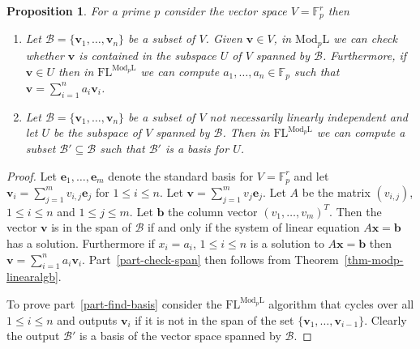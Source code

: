\documentclass[11pt]{madras}%
\newtheorem{proposition}[theorem]{Proposition}
\theoremstyle{remark}
\newcommand{\ModkL}[1]{{\ensuremath{\mathrm{Mod}_{#1}\mathrm{L}}}}
\begin{document}
\begin{proposition}\label{prop-compute-basis-fp}
  For a prime $p$ consider the vector space $V = \mathbb{F}_p^r$ then
  \begin{enumerate}
  \item \label{part-check-span}%
    Let $\mathcal{B} = \{ \mathbf{v}_1,\ldots,\mathbf{v}_n \}$ be a
    subset of $V$. Given $\mathbf{v} \in V$, in $\ModkL{p}$ we can
    check whether $\mathbf{v}$ is contained in the subspace $U$ of $V$
    spanned by $\mathcal{B}$. Furthermore, if $\mathbf{v} \in U$ then
    in $\mathrm{FL}^{\ModkL{p}}$ we can compute $a_1,\ldots,a_n \in
    \mathbb{F}_p$ such that $\mathbf{v} = \sum_{i=1}^n a_i
    \mathbf{v}_i$.
  \item \label{part-find-basis}%
    Let $\mathcal{B} = \{ \mathbf{v}_1,\ldots,\mathbf{v}_n \}$ be a
    subset of $V$ not necessarily linearly independent and let $U$ be
    the subspace of $V$ spanned by $\mathcal{B}$. Then in
    $\mathrm{FL}^{\ModkL{p}}$ we can compute a subset $\mathcal{B}'
    \subseteq \mathcal{B}$ such that $\mathcal{B}'$ is a basis for
    $U$.
  \end{enumerate}
\end{proposition}
\begin{proof}

  Let $\mathbf{e}_1,\ldots,\mathbf{e}_m$ denote the standard basis for
  $V = \mathbb{F}_p^r$ and let $\mathbf{v}_i = \sum_{j= 1}^m v_{i,j}
  \mathbf{e}_j$ for $1 \leq i \leq n$. Let $\mathbf{v} = \sum_{j =
    1}^m v_j \mathbf{e}_j$. Let $A$ be the matrix $(v_{i,j})$, $1\leq
  i \leq n$ and $1 \leq j \leq m$. Let $\mathbf{b}$ the column vector
  $(v_1,\ldots,v_m)^T$. Then the vector $\mathbf{v}$ is in the span of
  $\mathcal{B}$ if and only if the system of linear equation $A
  \mathbf{x} = \mathbf{b}$ has a solution. Furthermore if $x_i = a_i$,
  $1 \leq i \leq n$ is a solution to $A \mathbf{x} = \mathbf{b}$ then
  $\mathbf{v} = \sum_{i = 1}^n a_i \mathbf{v}_i$.
  Part~\ref{part-check-span} then follows from
  Theorem~\ref{thm-modp-linearalgb}.

  To prove part~\ref{part-find-basis} consider the
  $\mathrm{FL}^{\ModkL{p}}$ algorithm that cycles over all $1 \leq i
  \leq n$ and outputs $\mathbf{v}_i$ if it is not in the span of the
  set $\{\mathbf{v}_1,\ldots,\mathbf{v}_{i-1} \}$. Clearly the output
  $\mathcal{B}'$ is a basis of the vector space spanned by
  $\mathcal{B}$.
\end{proof}
\end{document}
